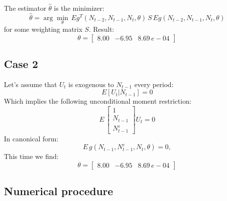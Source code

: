     The estimator $\hat \theta$ is the minimizer:
    \begin{equation}
        \hat \theta = \arg \min_{\theta} \, E g^T(N_{t-2}, N_{t-1}, N_t, \theta)  \, S \, E g(N_{t-2}, N_{t-1}, N_t, \theta)
    \end{equation}
    for some weighting matrix $S$.
    Result:
    \begin{equation}
        \theta =  \begin{bmatrix}
        8.00 &-6.95 &  8.69 \,e-04
        \end{bmatrix}     \end{equation}


    \subsection{Case 2}
    Let's assume that $U_t$ is exogenous to $N_{t-1}$ every period:
    \begin{equation}
        E[U_t|N_{t-1}] = 0
    \end{equation}
    Which implies the following unconditional moment restriction:
    \begin{equation}
        E \, \begin{bmatrix} 1  \\ N_{t-1} \\ N^{\varepsilon}_{t-1} \end{bmatrix} U_t = 0
    \end{equation}
    In canonical form:
     \begin{equation}
        E \, g(N_{t-1}, N^{\varepsilon}_{t-1}, N_t, \theta) = 0,
    \end{equation}
    This time we find:
    \begin{equation}
        \theta =  \begin{bmatrix}
        8.00 &-6.95 &  8.69 \,e-04
        \end{bmatrix}
    \end{equation}


    \subsection{Numerical procedure}
